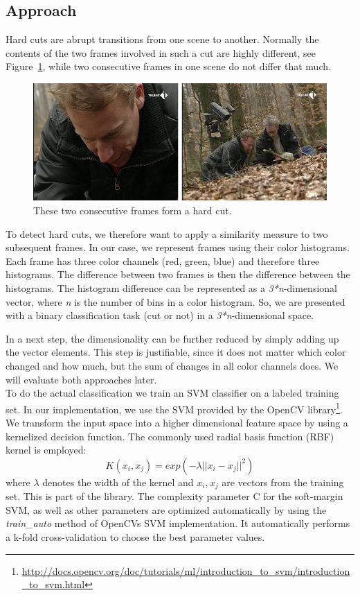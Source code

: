 \subsection{Approach}
\label{sec:hard_cut_approach}

Hard cuts are abrupt transitions from one scene to another.
Normally the contents of the two frames involved in such a cut are highly different, see Figure~\ref{fig:hard_cut_example}, while two consecutive frames in one scene do not differ that much.

\begin{figure}[ht]
	\centering
	\includegraphics[scale=.7]{images/hard_cut_example.png}
	\caption{These two consecutive frames form a hard cut.}
	\label{fig:hard_cut_example}
\end{figure}

To detect hard cuts, we therefore want to apply a similarity measure to two subsequent frames.
In our case, we represent frames using their color histograms.
Each frame has three color channels (red, green, blue) and therefore three histograms.
The difference between two frames is then the difference between the histograms.
The histogram difference can be represented as a \emph{3*n}-dimensional vector, where \emph{n} is the number of bins in a color histogram.
So, we are presented with a binary classification task (cut or not) in a \emph{3*n}-dimensional space.

In a next step, the dimensionality can be further reduced by simply adding up the vector elements.
This step is justifiable, since it does not matter which color changed and how much, but the sum of changes in all color channels does.
We will evaluate both approaches later. \\
To do the actual classification we train an SVM classifier on a labeled training set.
In our implementation, we use the SVM provided by the OpenCV library\footnote{\url{http://docs.opencv.org/doc/tutorials/ml/introduction_to_svm/introduction_to_svm.html}}.
We transform the input space into a higher dimensional feature space by using a kernelized decision function. The commonly used radial basis function (RBF) kernel is employed:
$$K(x_i,x_j) = exp(-\lambda || x_i - x_j ||^2)$$
where $\lambda$ denotes the width of the kernel and $x_i, x_j $ are vectors from the training set.
This is part of the library.
The complexity parameter C for the soft-margin SVM, as well as other parameters are optimized automatically by using the \emph{train\_auto} method of OpenCVs SVM implementation.
It automatically performs a k-fold cross-validation to choose the best parameter values.
